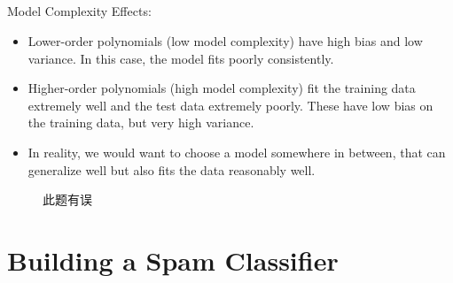 \documentclass{article}
\begin{document}
\begin{CJK}{UTF8}{gbsn}
\subparagraph{}
Model Complexity Effects:
\begin{itemize}
\item Lower-order polynomials (low model complexity) have high bias and low variance. In this case, the model fits poorly consistently.
\item Higher-order polynomials (high model complexity) fit the training data extremely well and the test data extremely poorly. These have low bias on the training data, but very high variance.
\item In reality, we would want to choose a model somewhere in between, that can generalize well but also fits the data reasonably well.
\end{itemize}
\begin{figure}[H]
\label{fig:650}
\end{figure}
\begin{figure}[H]
\label{fig:651}
\end{figure}
\begin{figure}[H]
\label{fig:652}
\end{figure}
\begin{figure}[H]
\label{fig:653}
\end{figure}
\begin{figure}[H]
\label{fig:654}
\end{figure}
\begin{figure}[H]
\label{fig:655}
\end{figure}
\begin{figure}[H]
\label{fig:656}
\end{figure}
\begin{figure}[H]
\label{fig:657}
\caption{此题有误}
\end{figure}
\section{Building a Spam Classifier}

\end{CJK}
\end{document}
